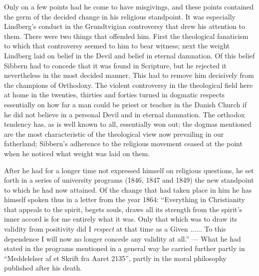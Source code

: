 \documentclass[12pt,a4paper,openany]{book}
\newcommand{\opage}[1]{\marginnote{\footnotesize\textit{[#1]}}}
\begin{document}
Only on a few points had he come to have
misgivings, and these points contained the germ of the decided
change in his religious standpoint. It was especially
Lindberg's conduct in the Grundtvigian controversy that drew his
attention to them. There were two things that offended him.
First the theological fanaticism to which that controversy
seemed to him to bear witness; next the weight Lindberg laid on
belief in the Devil and belief in eternal damnation. Of this
belief Sibbern had to concede that it was found in Scripture, but
he rejected it nevertheless in the most decided manner. This
had to remove him decisively from the champions of Orthodoxy.
The violent controversy in the theological field here at home in
\opage{93}the twenties, thirties and forties turned in dogmatic
respects essentially on how far a man could be
priest or teacher in the Danish Church if he did not believe
in a personal Devil and in eternal damnation. The
orthodox tendency has, as is well known to all, essentially won out;
the dogmas mentioned are the most characteristic of the theological view
now prevailing in our fatherland; Sibbern's
adherence to the religious movement ceased at the point
when he noticed what weight was laid on them.

After he had for a longer time not expressed himself on
religious questions, he set forth in a series of
university programs (1846, 1847 and 1849) the new standpoint
to which he had now attained. Of the change that
had taken place in him he has himself spoken thus in a letter
from the year 1864: ``Everything in Christianity that appeals to the spirit, begets souls, draws all its
strength from the spirit's inner accord
is for me entirely what it was. Only that which was
to draw its validity from positivity did I \emph{respect}
at that time as a Given ...... To this dependence %
I will now no longer concede any validity at all.'' --- What he
had stated in the programs mentioned in a general way
he carried further partly in ``Meddelelser af et Skrift fra
Aaret 2135'', partly in the moral philosophy published after his death.
\end{document}
